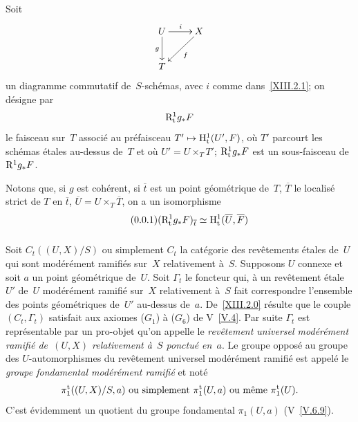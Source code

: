 Soit
$$
\xymatrix{{U}\ar[r]^i\ar[d]_g&{X}\ar[dl]^f\\{T}}
$$
un diagramme commutatif de~$S$-sch\'emas, avec $i$ comme
dans~\ref{XIII.2.1}; on d\'esigne par
$$
\mathrm{R}^1_{\mathrm{t}} g_* F
$$
\label{indnot:md}le faisceau sur~$T$ associ\'e au pr\'efaisceau
$T'\mto\H^1_{\tame}(U',F)$, o\`u $T'$ parcourt les sch\'emas
\'etales au-dessus de~$T$ et o\`u $U'=U\times_T T'$; $\mathrm{R}^1_{\mathrm{t}} g_*F$
est un sous-faisceau de~$\mathrm{R}^1g_*F$.

Notons que, si $g$ est coh\'erent, si $\overline{t}$ est un point
g\'eom\'etrique de~$T$, $\overline{T}$ le localis\'e strict de
$T$ en $\overline{t}$, $\overline{U}=U\times_T\overline{T}$, on a un
isomorphisme
\begin{equation*}
\label{eq:XIII.2.1.2.1}
\tag{\thesubsubsection.1} (\R^1_{\tame} g_*F)_{\overline{t}}\simeq
\H^1_{\tame}(\overline{U},\overline{F})
\end{equation*}

\subsubsection{}
\label{XIII.2.1.3}
Soit $C_t((U,X)/S)$ ou simplement $C_t$
\label{indnot:me}la cat\'egorie des rev\^etements \'etales de~$U$ qui sont
mod\'er\'ement ramifi\'es sur~$X$ relativement
\`a~$S$. Supposons $U$ connexe et soit $a$ un point
g\'eom\'etrique de~$U$. Soit $\Gamma_t$ le foncteur qui, \`a un
rev\^etement \'etale~$U'$ de~$U$ mod\'er\'ement ramifi\'e
sur~$X$ relativement \`a~$S$ fait correspondre l'ensemble des points
g\'eom\'etriques de~$U'$ au-dessus de~$a$. De~\ref{XIII.2.0}
r\'esulte que le couple $(C_t,\Gamma_t)$ satisfait aux axiomes
($G_1$) \`a ($G_6$) de V~\ref{V.4}. Par suite $\Gamma_t$ est
repr\'esentable par un pro-objet qu'on appelle le
\emph{revêtement universel modérément ramifié
de~$(U,X)$ relativement à~$S$ ponctué en~$a$}.
Le groupe oppos\'e au groupe des $U$-automorphismes du
rev\^etement universel mod\'er\'ement ramifi\'e est appel\'e
le \emph{groupe fondamental modérément ramifié}
et not\'e
$$
\pi_1^{\mathrm{t}}((U,X)/S,a)\text{ ou simplement }\pi_1^{\mathrm{t}}(U,a)\text{ ou
même }\pi_1^{\mathrm{t}}(U).
$$
\label{indnot:mf}C'est \'evidemment un quotient du groupe fondamental $\pi_1(U,a)$
(V~\ref{V.6.9}).

